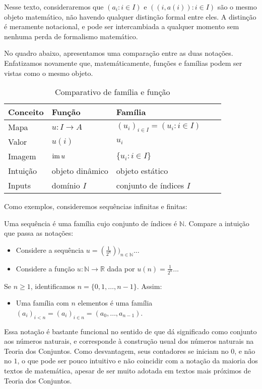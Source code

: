 Nesse texto, consideraremos que $(a_i: i \in I)$ e $((i, a(i)): i \in I)$ são o mesmo objeto matemático, não havendo qualquer distinção formal entre eles.
A distinção é meramente notacional, e pode ser intercambiada a qualquer momento sem nenhuma perda de formalismo matemático.

No quadro abaixo, apresentamos uma comparação entre as duas notações.
Enfatizamos novamente que, matemáticamente, funções e famílias podem ser vistas como o mesmo objeto.
\begin{table}[h]
    \centering
    \begin{tabular}{lllll}
        \hline
        \textbf{Conceito} & \textbf{Função} & \textbf{Família} \\ \hline
        Mapa & $u:I\rightarrow A$ & $(u_i)_{i \in I}=(u_i: i \in I)$ \\
        Valor & $u(i)$ & $u_i$ \\
        Imagem & $\operatorname{im} u$ & $\{u_i: i \in I\}$\\
        Intuição & objeto dinâmico & objeto estático \\
        Inputs & domínio $I$ & conjunto de índices $I$ \\
        \hline
    \end{tabular}
    \caption{Comparativo de família e função}
\end{table}

Como exemplos, consideremos sequências infinitas e finitas:

\begin{exemplo}[Sequências]
    Uma sequência é uma família cujo conjunto de índices é $\mathbb N$.
    Compare a intuição que passa as notações:
    \begin{itemize}
    \item Considere a sequência $u=(\frac{1}{2^n}))_{n \in \mathbb N}$...
    \item Considere a função $u:\mathbb N\rightarrow \mathbb R$ dada por $u(n)=\frac{1}{2^n}$...
    \end{itemize}
\end{exemplo}

\begin{exemplo}
    Se $n\geq 1$, identificamos $n=\{0, 1, \dots, n-1\}$.
    Assim:
    \begin{itemize}
    \item Uma família com $n$ elementos é uma família $(a_i)_{i<n}=(a_i)_{i \in n}=(a_0, \dots, a_{n-1})$.
    \end{itemize}

    Essa notação é bastante funcional no sentido de que dá significado como conjunto aos números naturais, e corresponde à construção usual dos números naturais na Teoria dos Conjuntos.
    Como desvantagem, seus contadores se iniciam no $0$, e não no $1$, o que pode ser pouco intuitivo e não coincidir com a notação da maioria dos textos de matemática, apesar de ser muito adotada em textos mais próximos de Teoria dos Conjuntos.
\end{exemplo}

